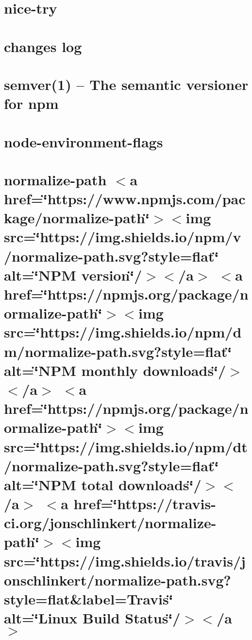 \let\mypdfximage\pdfximage\def\pdfximage{\immediate\mypdfximage}\documentclass[twoside]{book}
\newcommand{\+}{\discretionary{\mbox{\scriptsize$\hookleftarrow$}}{}{}}
\begin{document}
\chapter{nice-\/try}
\label{md_heap-visualizer_node_modules_nice-try__r_e_a_d_m_e}

\chapter{changes log}
\label{md_heap-visualizer_node_modules_node-environment-flags_node_modules_semver__c_h_a_n_g_e_l_o_g}

\chapter{semver(1) -- The semantic versioner for npm}
\label{md_heap-visualizer_node_modules_node-environment-flags_node_modules_semver__r_e_a_d_m_e}

\chapter{node-\/environment-\/flags}
\label{md_heap-visualizer_node_modules_node-environment-flags__r_e_a_d_m_e}

\chapter{normalize-\/path $<$a href=\char`\"{}https\+://www.\+npmjs.\+com/package/normalize-\/path\char`\"{}$>$$<$img src=\char`\"{}https\+://img.\+shields.\+io/npm/v/normalize-\/path.\+svg?style=flat\char`\"{} alt=\char`\"{}\+N\+P\+M version\char`\"{}/$>$$<$/a$>$ $<$a href=\char`\"{}https\+://npmjs.\+org/package/normalize-\/path\char`\"{}$>$$<$img src=\char`\"{}https\+://img.\+shields.\+io/npm/dm/normalize-\/path.\+svg?style=flat\char`\"{} alt=\char`\"{}\+N\+P\+M monthly downloads\char`\"{}/$>$$<$/a$>$ $<$a href=\char`\"{}https\+://npmjs.\+org/package/normalize-\/path\char`\"{}$>$$<$img src=\char`\"{}https\+://img.\+shields.\+io/npm/dt/normalize-\/path.\+svg?style=flat\char`\"{} alt=\char`\"{}\+N\+P\+M total downloads\char`\"{}/$>$$<$/a$>$ $<$a href=\char`\"{}https\+://travis-\/ci.\+org/jonschlinkert/normalize-\/path\char`\"{}$>$$<$img src=\char`\"{}https\+://img.\+shields.\+io/travis/jonschlinkert/normalize-\/path.\+svg?style=flat\&label=\+Travis\char`\"{} alt=\char`\"{}\+Linux Build Status\char`\"{}/$>$$<$/a$>$}
\label{md_heap-visualizer_node_modules_normalize-path__r_e_a_d_m_e}

\end{document}
